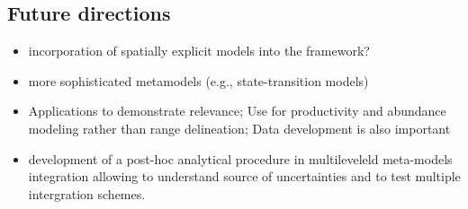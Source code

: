 \subsection*{Future directions}
\begin{itemize}
	\item incorporation of spatially explicit models into the framework? \citep[e.g.,][]{Fortin2012}
	\item more sophisticated metamodels (e.g., state-transition models)
	\item Applications to demonstrate relevance; Use for productivity and abundance modeling rather than range delineation; Data development is also important
	\item development of a post-hoc analytical procedure in multileveleld meta-models integration allowing to understand source of uncertainties and to test multiple intergration schemes.
\end{itemize}
